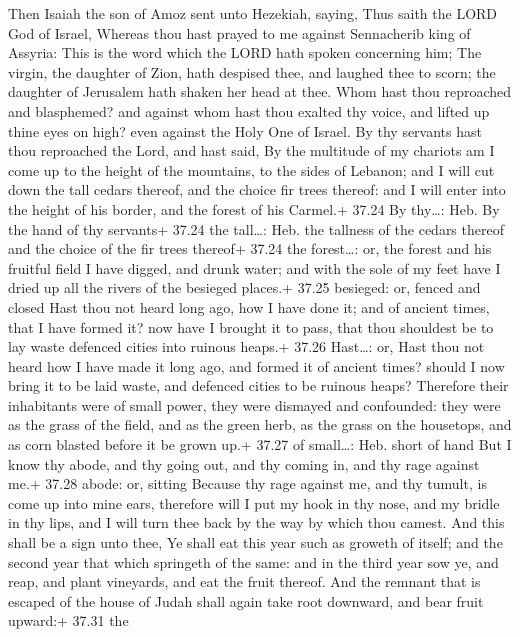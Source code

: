  Then Isaiah the son of Amoz sent unto Hezekiah, saying,
Thus saith the LORD God of Israel, Whereas thou hast prayed to me
against Sennacherib king of Assyria:  This is the word
which the LORD hath spoken concerning him; The virgin, the daughter of
Zion, hath despised thee, and laughed thee to scorn; the daughter of
Jerusalem hath shaken her head at thee.  Whom hast thou
reproached and blasphemed? and against whom hast thou exalted thy voice,
and lifted up thine eyes on high? even against the Holy One of Israel.
 By thy servants hast thou reproached the Lord, and hast
said, By the multitude of my chariots am I come up to the height of the
mountains, to the sides of Lebanon; and I will cut down the tall cedars
thereof, and the choice fir trees thereof: and I will enter into the
height of his border, and the forest of his Carmel.+ 37.24 By thy\ldots:
Heb. By the hand of thy servants+ 37.24 the tall\ldots: Heb. the
tallness of the cedars thereof and the choice of the fir trees thereof+
37.24 the forest\ldots: or, the forest and his fruitful field
 I have digged, and drunk water; and with the sole of my
feet have I dried up all the rivers of the besieged places.+ 37.25
besieged: or, fenced and closed  Hast thou not heard long
ago, how I have done it; and of ancient times, that I have formed it?
now have I brought it to pass, that thou shouldest be to lay waste
defenced cities into ruinous heaps.+ 37.26 Hast\ldots: or, Hast thou not
heard how I have made it long ago, and formed it of ancient times?
should I now bring it to be laid waste, and defenced cities to be
ruinous heaps?  Therefore their inhabitants were of small
power, they were dismayed and confounded: they were as the grass of the
field, and as the green herb, as the grass on the housetops, and as corn
blasted before it be grown up.+ 37.27 of small\ldots: Heb. short of hand
 But I know thy abode, and thy going out, and thy coming
in, and thy rage against me.+ 37.28 abode: or, sitting 
Because thy rage against me, and thy tumult, is come up into mine ears,
therefore will I put my hook in thy nose, and my bridle in thy lips, and
I will turn thee back by the way by which thou camest.  And
this shall be a sign unto thee, Ye shall eat this year such as groweth
of itself; and the second year that which springeth of the same: and in
the third year sow ye, and reap, and plant vineyards, and eat the fruit
thereof.  And the remnant that is escaped of the house of
Judah shall again take root downward, and bear fruit upward:+ 37.31 the
